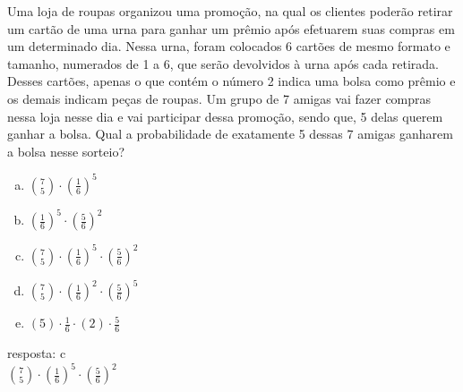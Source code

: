 \begin{ex}
Uma loja de roupas organizou uma promoção, na qual os clientes poderão retirar um cartão de uma urna para ganhar um prêmio após efetuarem suas compras em um determinado dia. Nessa urna, foram colocados 6 cartões de mesmo formato e tamanho, numerados de 1 a 6, que serão devolvidos à urna após cada retirada. Desses cartões, apenas o que contém o número 2 indica uma bolsa como prêmio e os demais indicam peças de roupas. Um grupo de 7 amigas vai fazer compras nessa loja nesse dia e vai participar dessa promoção, sendo que, 5 delas querem ganhar a bolsa.
Qual a probabilidade de exatamente 5 dessas 7 amigas ganharem a bolsa nesse sorteio?

    \begin{enumerate}[(a)]
    \item $\binom{7}{5}\cdot(\frac{1}{6})^5$
    \item $(\frac{1}{6})^5\cdot(\frac{5}{6})^2$
    \item $\binom{7}{5}\cdot(\frac{1}{6})^5\cdot(\frac{5}{6})^2$
    \item $\binom{7}{5}\cdot(\frac{1}{6})^2\cdot(\frac{5}{6})^5$
    \item $(5)\cdot\frac{1}{6}\cdot(2)\cdot\frac{5}{6}$
    \end{enumerate}
      \begin{sol}
       resposta: c \\
       $\binom{7}{5}\cdot(\frac{1}{6})^5\cdot(\frac{5}{6})^2$
      \end{sol}
\end{ex}